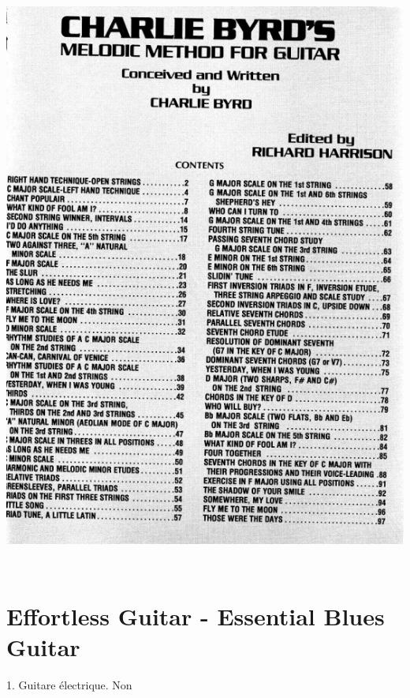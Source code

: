 \documentclass[a4paper]{book}
\begin{document}
\begin{center}
\includegraphics[width=14.444cm,height=19.496cm]{lebluessupportsmethodes-img60.png}
\end{center}
\clearpage


\section[Effortless Guitar {}- Essential Blues Guitar ]{Effortless
Guitar - Essential Blues Guitar }
\hypertarget{RefHeadingToc132973218262}{}1. Guitare \'electrique. Non
\end{document}
